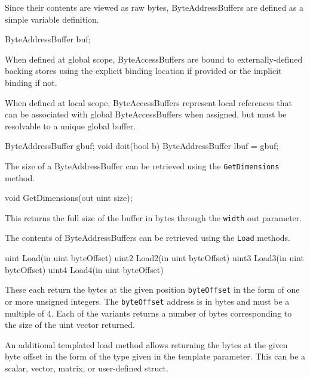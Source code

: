 
Since their contents are viewed as raw bytes, ByteAddressBuffers are defined as a simple variable definition.
\begin{HLSL}
  ByteAddressBuffer buf;
\end{HLSL}

When defined at global scope, ByteAccessBuffers are bound to externally-defined backing stores
using the explicit binding location if provided or the implicit binding if not.

When defined at local scope, ByteAccessBuffers represent local references
that can be associated with global ByteAccessBuffers when assigned,
but must be resolvable to a unique global buffer.

\begin{HLSL}
  ByteAddressBuffer gbuf;
  void doit(bool b) {
    ByteAddressBuffer lbuf = gbuf;
  }
\end{HLSL}


The size of a ByteAddressBuffer can be retrieved using the \texttt{GetDimensions} method.
\begin{HLSL}
void GetDimensions(out uint size);
\end{HLSL}

This returns the full size of the buffer in bytes through the \texttt{width} out parameter.


The contents of ByteAddressBuffers can be retrieved using the \texttt{Load} methods.

\begin{HLSL}
 uint Load(in uint byteOffset)
 uint2 Load2(in uint byteOffset)
 uint3 Load3(in uint byteOffset)
 uint4 Load4(in uint byteOffset)
\end{HLSL}

These each return the bytes at the given position \texttt{byteOffset} in the form of one or more unsigned integers.
The \texttt{byteOffset} address is in bytes and must be a multiple of 4.
Each of the variants returns a number of bytes corresponding to the size of the uint vector returned.

An additional templated load method allows returning the bytes at the given byte offset in the form
of the type given in the template parameter. This can be a scalar, vector, matrix, or user-defined struct.

